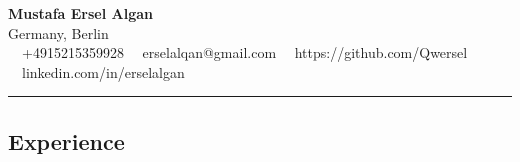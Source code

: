 \documentclass[11pt,letterpaper]{article}
\begin{document}
\begin{center}
	{\LARGE \textbf{Mustafa Ersel Algan}}\\
	Germany, Berlin
	\vspace{0.05cm}
	\\
	\raisebox{-0.2\height} {\Large \faPhoneSquare} \ \  +4915215359928 \hfill\raisebox{-0.2\height}{\Large \faEnvelopeSquare} \ \ erselalqan@gmail.com \hfill \raisebox{-0.2\height}{\Large \faGithubSquare} \ \ https://github.com/Qwersel \hfill \raisebox{-0.2\height}{\Large \faLinkedin} \ \ linkedin.com/in/erselalgan
\end{center}

\hrule
\vspace{-1em}
\subsection*{\Large Experience}
\end{document}
